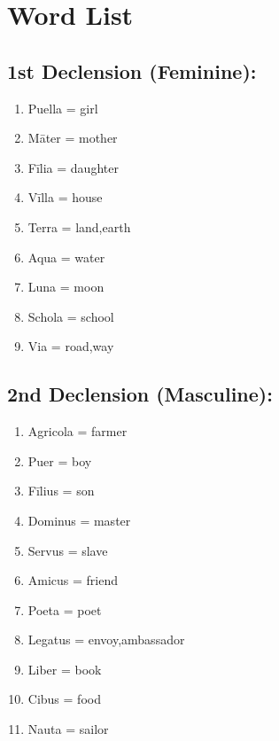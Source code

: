 \section*{Word List}
\begin{minipage}[t]{0.48\linewidth} 
  \subsection*{1st Declension (Feminine):}
  \begin{enumerate}
    \item Puella = girl 
    \item Māter = mother
    \item Fīlia = daughter 
    \item Vīlla = house
    \item Terra = land,earth
    \item Aqua = water
    \item Luna = moon
    \item Schola = school 
    \item Via = road,way
  \end{enumerate}
\end{minipage}
\hfill
\begin{minipage}[t]{0.48\linewidth} 
  \subsection*{2nd Declension (Masculine):}
  \begin{enumerate}
    \item Agricola = farmer
    \item Puer = boy 
    \item Fīlius = son 
    \item Dominus = master 
    \item Servus = slave 
    \item Amicus = friend 
    \item Poeta = poet 
    \item Legatus = envoy,ambassador
    \item Liber = book
    \item Cibus = food
    \item Nauta = sailor
  \end{enumerate}
\end{minipage}
